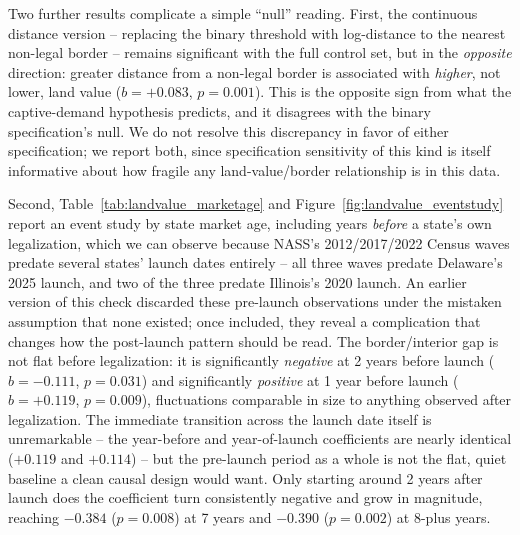 ﻿\documentclass{article}
\begin{document}
Two further results complicate a simple ``null'' reading. First, the continuous distance version --
replacing the binary threshold with log-distance to the nearest non-legal border -- remains significant
with the full control set, but in the \emph{opposite} direction: greater distance from a non-legal border
is associated with \emph{higher}, not lower, land value ($b=+0.083$, $p=0.001$). This is the opposite sign
from what the captive-demand hypothesis predicts, and it disagrees with the binary specification's null.
We do not resolve this discrepancy in favor of either specification; we report both, since specification
sensitivity of this kind is itself informative about how fragile any land-value/border relationship is in
this data.



Second, Table~\ref{tab:landvalue_marketage} and Figure~\ref{fig:landvalue_eventstudy} report an event
study by state market age, including years \emph{before} a state's own legalization, which we can observe
because NASS's 2012/2017/2022 Census waves predate several states' launch dates entirely -- all three
waves predate Delaware's 2025 launch, and two of the three predate Illinois's 2020 launch. An earlier
version of this check discarded these pre-launch observations under the mistaken assumption that none
existed; once included, they reveal a complication that changes how the post-launch pattern should be
read. The border/interior gap is not flat before legalization: it is significantly \emph{negative} at
2 years before launch ($b=-0.111$, $p=0.031$) and significantly \emph{positive} at 1 year before launch
($b=+0.119$, $p=0.009$), fluctuations comparable in size to anything observed after legalization. The
immediate transition across the launch date itself is unremarkable -- the year-before and year-of-launch
coefficients are nearly identical ($+0.119$ and $+0.114$) -- but the pre-launch period as a whole is not the
flat, quiet baseline a clean causal design would want. Only starting around 2 years after launch does the
coefficient turn consistently negative and grow in magnitude, reaching $-0.384$ ($p=0.008$) at 7 years and
$-0.390$ ($p=0.002$) at 8-plus years.
\end{document}
